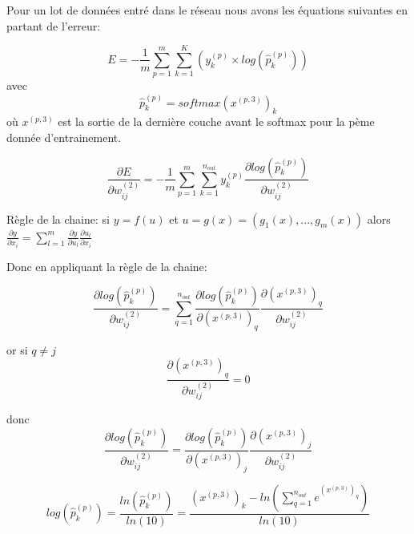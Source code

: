 \documentclass[a4paper,11pt,oneside,roman]{article}
\begin{document}
    Pour un lot de données entré dans le réseau nous avons les équations suivantes en partant de l'erreur:
    
    \begin{equation}
        E = -\frac{1}{m} \sum\limits_{p=1}^m\sum\limits_{k=1}^K (y_{k}^{(p)} \times log(\hat{p}_{k}^{(p)}))
    \end{equation}
avec 
    \begin{equation}
        \hat{p}_{k}^{(p)} = softmax(x^{(p,3)})_k
    \end{equation}
    où $x^{(p,3)}$ est la sortie de la dernière couche avant le softmax pour la pème donnée d'entrainement.

    \begin{equation}
        \frac{\partial E}{\partial w_{ij}^{(2)}} = -\frac{1}{m} \sum\limits_{p=1}^{m} \sum\limits_{k=1}^{n_{out}} y_k^{(p)} \frac{\partial log(\hat{p}_{k}^{(p)})}{\partial w_{ij}^{(2)}}
    \end{equation}

    Règle de la chaine:
    si $y = f(u)$ et $u=g(x)=(g_1(x), ..., g_m(x))$ alors $\frac{\partial y}{\partial x_i} = \sum\limits_{l=1}^{m} \frac{\partial y}{\partial u_l} \frac{\partial u_l}{\partial x_i}$
    
    Donc en appliquant la règle de la chaine:
    
    \begin{equation}
        \frac{\partial log(\hat{p}_{k}^{(p)})}{\partial w_{ij}^{(2)}} = \sum\limits_{q=1}^{n_{out}} \frac{\partial log(\hat{p}_{k}^{(p)})}{\partial (x^{(p,3)})_{q}} \frac{\partial (x^{(p,3)})_{q}}{\partial w_{ij}^{(2)}}
    \end{equation}
    
    or si $q \ne j$
    \begin{equation}
       \frac{\partial (x^{(p,3)})_{q}}{\partial w_{ij}^{(2)}} = 0
    \end{equation}
    
    donc
    \begin{equation}
        \frac{\partial log(\hat{p}_{k}^{(p)})}{\partial w_{ij}^{(2)}} = \frac{\partial log(\hat{p}_{k}^{(p)})}{\partial (x^{(p,3)})_{j}} \frac{\partial (x^{(p,3)})_{j}}{\partial w_{ij}^{(2)}}
    \end{equation}

    \begin{equation}
        log(\hat{p}_{k}^{(p)}) = \frac{ln(\hat{p}_{k}^{(p)})}{ln(10)} = \frac{(x^{(p,3)})_k - ln(\sum\limits_{q=1}^{n_{out}} e^{(x^{(p,3)})_q})} {ln(10)}
    \end{equation}
\end{document}
